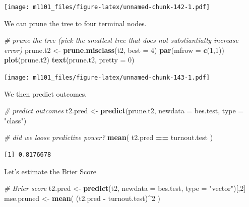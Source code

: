 \documentclass[]{article}
\newenvironment{Shaded}{\begin{snugshade}}{\end{snugshade}}
\newcommand{\CommentTok}[1]{\textcolor[rgb]{0.56,0.35,0.01}{\textit{#1}}}
\newcommand{\DataTypeTok}[1]{\textcolor[rgb]{0.13,0.29,0.53}{#1}}
\newcommand{\DecValTok}[1]{\textcolor[rgb]{0.00,0.00,0.81}{#1}}
\newcommand{\KeywordTok}[1]{\textcolor[rgb]{0.13,0.29,0.53}{\textbf{#1}}}
\newcommand{\NormalTok}[1]{#1}
\newcommand{\OperatorTok}[1]{\textcolor[rgb]{0.81,0.36,0.00}{\textbf{#1}}}
\newcommand{\StringTok}[1]{\textcolor[rgb]{0.31,0.60,0.02}{#1}}
\begin{document}
\texttt{[image: ml101\_files/figure-latex/unnamed-chunk-142-1.pdf]}

We can prune the tree to four terminal nodes.

\begin{Shaded}
\begin{Highlighting}[]
\CommentTok{# prune the tree (pick the smallest tree that does not substiantially increase error)}
\NormalTok{prune.t2 <-}\StringTok{ }\KeywordTok{prune.misclass}\NormalTok{(t2, }\DataTypeTok{best =} \DecValTok{4}\NormalTok{)}
\KeywordTok{par}\NormalTok{(}\DataTypeTok{mfrow =} \KeywordTok{c}\NormalTok{(}\DecValTok{1}\NormalTok{,}\DecValTok{1}\NormalTok{))}
\KeywordTok{plot}\NormalTok{(prune.t2)}
\KeywordTok{text}\NormalTok{(prune.t2, }\DataTypeTok{pretty =} \DecValTok{0}\NormalTok{)}
\end{Highlighting}
\end{Shaded}

\texttt{[image: ml101\_files/figure-latex/unnamed-chunk-143-1.pdf]}

We then predict outcomes.

\begin{Shaded}
\begin{Highlighting}[]
\CommentTok{# predict outcomes}
\NormalTok{t2.pred <-}\StringTok{ }\KeywordTok{predict}\NormalTok{(prune.t2, }\DataTypeTok{newdata =}\NormalTok{ bes.test, }\DataTypeTok{type =} \StringTok{"class"}\NormalTok{)}

\CommentTok{# did we loose predictive power?}
\KeywordTok{mean}\NormalTok{( t2.pred }\OperatorTok{==}\StringTok{ }\NormalTok{turnout.test )}
\end{Highlighting}
\end{Shaded}

\begin{verbatim}
[1] 0.8176678
\end{verbatim}

Let's estimate the Brier Score

\begin{Shaded}
\begin{Highlighting}[]
\CommentTok{# Brier score}
\NormalTok{t2.pred <-}\StringTok{ }\KeywordTok{predict}\NormalTok{(t2, }\DataTypeTok{newdata =}\NormalTok{ bes.test, }\DataTypeTok{type =} \StringTok{"vector"}\NormalTok{)[,}\DecValTok{2}\NormalTok{]}
\NormalTok{mse.pruned <-}\StringTok{ }\KeywordTok{mean}\NormalTok{( (t2.pred }\OperatorTok{-}\StringTok{ }\NormalTok{turnout.test)}\OperatorTok{^}\DecValTok{2}\NormalTok{ ) }
\end{Highlighting}
\end{Shaded}
\end{document}
